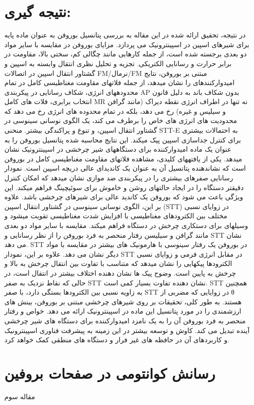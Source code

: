\section{نتیجه گیری:} 
در نتیجه، تحقیق ارائه شده در این مقاله به بررسی پتانسیل بوروفن به عنوان ماده پایه برای شیرهای اسپین در اسپینترونیک می پردازد. مزایای بوروفن در مقایسه با سایر مواد دو بعدی برجسته شده است، از جمله کارهایی مانند چگالی کم، سختی بالا، مقاومت در برابر حرارت و رسانایی الکتریکی. تجزیه و تحلیل نظری انتقال وابسته به اسپین و گشتاور انتقال اسپین در اتصالات FM/نرمال/FM مبتنی بر بوروفن، نتایج امیدوارکنندهای را نشان میدهد، از جمله فلاتهای مقاومت مغناطیسی کامل در تمام محدودههای انرژی، شکاف رسانایی در پیکربندی AP بدون شکاف باند به دلیل قانون انتخاب برابری، فلات های کامل MR نه تنها در اطراف انرژی نقطه دیراک (مانند گرافن و سیلیس و غیره) رخ می دهد، بلکه در تمام محدوده های انرژی رخ می دهد که محدودیت های انرژی های خاص را برطرف می کند، یک الگوی نوسانی سینوسی در گشتاور انتقال اسپین، و تنوع و پراکندگی بیشتر. منحنی STT-E به احتمالات بیشتری برای کنترل جداسازی اسپین پیک میکند. این نتایج محاسبه شده پتانسیل بوروفن را به عنوان یک ماده امیدوارکننده برای دستگاههای شیر چرخشی در اسپینترونیک نشان میدهد. یکی از یافتههای کلیدی، مشاهده فلاتهای مقاومت مغناطیسی کامل در بوروفن است که نشاندهنده پتانسیل آن به عنوان یک کاندیدای عالی دریچه اسپین است. نمودار رسانایی صفرهای بیشتری را در پیکربندی ضد موازی نشان میدهد که امکان کنترل دقیقتر دستگاه را در ایجاد حالتهای روشن و خاموش برای سوئیچینگ فراهم میکند. این ویژگی باعث می شود که بوروفن یک کاندید عالی برای شیرهای چرخشی باشد. علاوه بر این، الگوی نوسانی سینوسی در گشتاور انتقال اسپین (STT) در زوایای نسبی مختلف بین الکترودهای مغناطیسی با افزایش شدت مغناطیسی تقویت میشود و وسیلهای برای دستکاری چرخش در دستگاه فراهم میکند. مقایسه با سایر مواد دو بعدی مانند گرافن و سیلیسن رفتار منحصر به فرد بوروفن را از نظر رسانایی و STT نشان می دهد. STT در بوروفن یک رفتار سینوسی با هارمونیک های بیشتر در مقایسه با مواد دیگر نشان می دهد. علاوه بر این، نمودار STT در مقابل انرژی فرمی و زوایای نسبی الکترودها پیکهایی را نشان میدهد که متناسب با تفاوت بین انتقال چرخش به بالا و چرخش به پایین است. وضوح پیک ها نشان دهنده اختلاف بیشتر در انتقال است، در حالی که نقاط نزدیک به صفر STT نشان دهنده تفاوت بسیار کمی است. STT همچنین به زاویه نسبی بین الکترودها بستگی دارد، با صفر STT در زوایایی که مضربی از θ هستند. به طور کلی، تحقیقات بر روی شیرهای چرخشی مبتنی بر بوروفن، بینش های ارزشمندی را در مورد پتانسیل این ماده در اسپینترونیک ارائه می دهد. خواص و رفتار منحصر به فرد بوروفن آن را به یک نامزد امیدوارکننده برای دستگاه های شیر چرخشی آینده تبدیل می کند. کاوش و توسعه بیشتر در این زمینه به پیشرفت فناوری اسپینترونیک و کاربردهای آن در حافظه های غیر فرار و دستگاه های منطقی کمک خواهد کرد.
\section{رسانش کوانتومی در صفحات بروفین}
مقاله سوم
% 
% 
